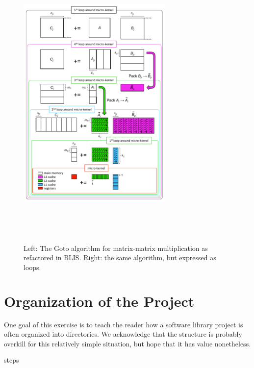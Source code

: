 \begin{figure}[tb!]
\begin{center}
\begin{minipage}{3in}
\mbox{\includegraphics[width=3.0in]{mm_blis_color.pdf}}
\end{minipage}
~~~
\begin{minipage}[t]{3in}
\footnotesize  
\mbox{  }
\end{minipage}
\end{center}
\caption{Left: The Goto algorithm for matrix-matrix multiplication as  
  refactored in BLIS.  Right: the same algorithm, but expressed as  
  loops.}
\label{fig:blis_gemm}
\end{figure}

\cite{Goto:2008:AHP}
\cite{BLIS1}
\cite{BLIS2}
\cite{BLIS3}
\cite{BLIS4}

\section{Organization of the Project}



One goal of this exercise is to teach the reader how a software library project is often organized into directories.  We acknowledge that the structure is probably overkill for this relatively simple situation, but hope that it has value nonetheless.



 {steps}



